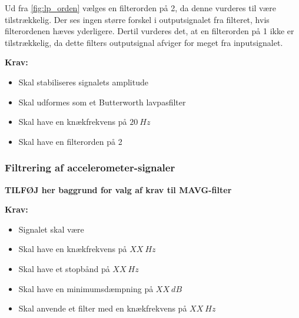 \noindent
Ud fra \ref{fig:lp_orden} vælges en filterorden på 2, da denne vurderes til være tilstrækkelig. Der ses ingen større forskel i outputsignalet fra filteret, hvis filterordenen hæves yderligere. Dertil vurderes det, at en filterorden på 1 ikke er tilstrækkelig, da dette filters outputsignal afviger for meget fra inputsignalet. 

\vspace{3mm}

\textbf{Krav:}
\begin{itemize}
\item Skal stabiliseres signalets amplitude
\item Skal udformes som et Butterworth lavpasfilter
\item Skal have en knækfrekvens på $20~Hz$
\item Skal have en filterorden på 2
\end{itemize}


\subsubsection{Filtrering af accelerometer-signaler}

\textbf{TILFØJ her baggrund for valg af krav til MAVG-filter}
\vspace{3mm}

\textbf{Krav:}
\begin{itemize}
\item Signalet skal være 
\item Skal have en knækfrekvens på $XX~Hz$
\item Skal have et stopbånd på $XX~Hz$
\item Skal have en minimumsdæmpning på $XX~dB$
\item Skal anvende et filter med en knækfrekvens på $XX~Hz$
\end{itemize}